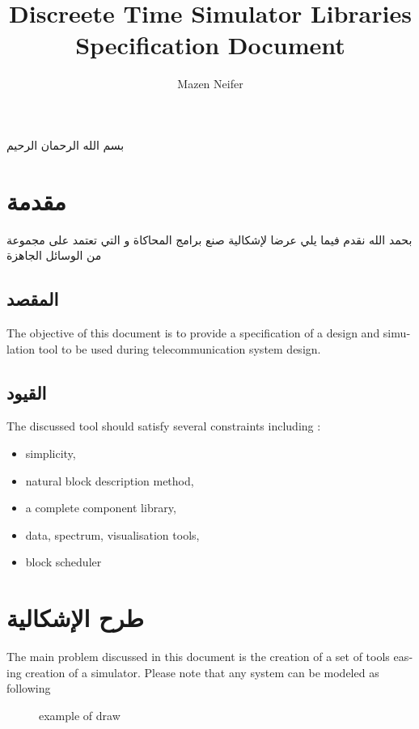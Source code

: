 \documentclass[10pt, a4paper]{article}
\begin{document}
\title{{\bf D}iscreete {\bf T}ime {\bf S}imulator {\bf L}ibraries\\Specification Document}
\author{Mazen Neifer}
\maketitle
\newpage
{}
\begin{center}
{\huge بسم الله الرحمان الرحيم}
\end{center}
\section{مقدمة}
بحمد الله نقدم فيما يلي عرضا لإشكالية صنع برامج المحاكاة  و التي تعتمد على مجموعة من الوسائل الجاهزة
\subsection{المقصد}
\begin{otherlanguage}{english}
The objective of this document is to provide a specification of a design and simulation tool to be used during telecommunication system design.
\end{otherlanguage}
\subsection{القيود}
\begin{otherlanguage}{english}
The discussed tool should satisfy several constraints including :
\begin{itemize}
\item simplicity,
\item natural block description method,
\item a complete component library,
\item data, spectrum, visualisation tools,
\item block scheduler
\end{itemize}
\end{otherlanguage}
\section{طرح الإشكالية}
\begin{otherlanguage}{english}
The main problem discussed in this document is the creation of a set of tools easing creation of a simulator. Please note that any system can be modeled as following
\begin{figure}[h]
\begin{texdraw}
\end{texdraw}
\caption{example of draw}
\end{figure}
\end{otherlanguage}
\end{document}
